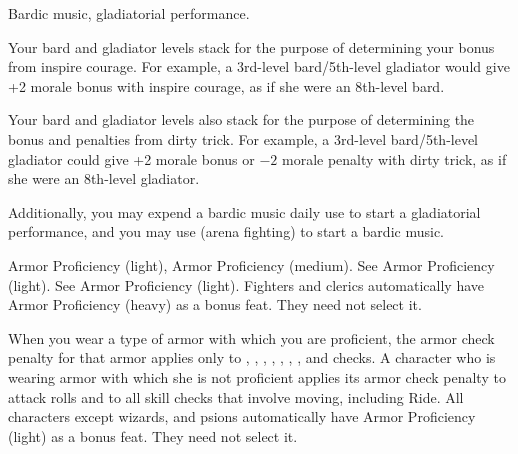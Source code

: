 {Bardic music, gladiatorial performance.}
{
Your bard and gladiator levels stack for the purpose of determining your bonus from inspire courage. For example, a 3rd-level bard/5th-level gladiator would give +2 morale bonus with inspire courage, as if she were an 8th-level bard.

Your bard and gladiator levels also stack for the purpose of determining the bonus and penalties from dirty trick. For example, a 3rd-level bard/5th-level gladiator could give +2 morale bonus or $-2$ morale penalty with dirty trick, as if she were an 8th-level gladiator.

Additionally, you may expend a bardic music daily use to start a gladiatorial performance, and you may use  (arena fighting) to start a bardic music.
}



{}
{Armor Proficiency (light), Armor Proficiency (medium).}
{See Armor Proficiency (light).}
{See Armor Proficiency (light).}
{Fighters and clerics automatically have Armor Proficiency (heavy) as a bonus feat. They need not select it.}

{}{}
{When you wear a type of armor with which you are proficient, the armor check penalty for that armor applies only to , , , , , , , and  checks.}
{A character who is wearing armor with which she is not proficient applies its armor check penalty to attack rolls and to all skill checks that involve moving, including Ride.}
{All characters except wizards, and psions automatically have Armor Proficiency (light) as a bonus feat. They need not select it.}

